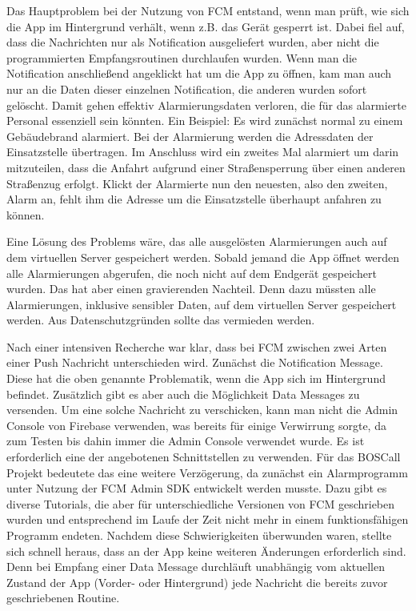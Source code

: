 Das Hauptproblem bei der Nutzung von FCM entstand, wenn man prüft, wie sich die App im Hintergrund verhält, wenn z.B. das Gerät gesperrt ist. Dabei fiel auf, dass die Nachrichten nur als Notification ausgeliefert wurden, aber nicht die programmierten Empfangsroutinen durchlaufen wurden. Wenn man die Notification anschließend angeklickt hat um die App zu öffnen, kam man auch nur an die Daten dieser einzelnen Notification, die anderen wurden sofort gelöscht. Damit gehen effektiv Alarmierungsdaten verloren, die für das alarmierte Personal essenziell sein könnten. Ein Beispiel: Es wird zunächst normal zu einem Gebäudebrand alarmiert. Bei der Alarmierung werden die Adressdaten der Einsatzstelle übertragen. Im Anschluss wird ein zweites Mal alarmiert um darin mitzuteilen, dass die Anfahrt aufgrund einer Straßensperrung über einen anderen Straßenzug erfolgt. Klickt der Alarmierte nun den neuesten, also den zweiten, Alarm an, fehlt ihm die Adresse um die Einsatzstelle überhaupt anfahren zu können.

Eine Lösung des Problems wäre, das alle ausgelösten Alarmierungen auch auf dem virtuellen Server gespeichert werden. Sobald jemand die App öffnet werden alle Alarmierungen abgerufen, die noch nicht auf dem Endgerät gespeichert wurden. Das hat aber einen gravierenden Nachteil. Denn dazu müssten alle Alarmierungen, inklusive sensibler Daten, auf dem virtuellen Server gespeichert werden. Aus Datenschutzgründen sollte das vermieden werden.

Nach einer intensiven Recherche war klar, dass bei FCM zwischen zwei Arten einer Push Nachricht unterschieden wird. Zunächst die Notification Message. Diese hat die oben genannte Problematik, wenn die App sich im Hintergrund befindet. Zusätzlich gibt es aber auch die Möglichkeit Data Messages zu versenden. Um eine solche Nachricht zu verschicken, kann man nicht die Admin Console von Firebase verwenden, was bereits für einige Verwirrung sorgte, da zum Testen bis dahin immer die Admin Console verwendet wurde. Es ist erforderlich eine der angebotenen Schnittstellen zu verwenden. Für das BOSCall Projekt bedeutete das eine weitere Verzögerung, da zunächst ein Alarmprogramm unter Nutzung der FCM Admin SDK entwickelt werden musste. Dazu gibt es diverse Tutorials, die aber für unterschiedliche Versionen von FCM geschrieben wurden und entsprechend im Laufe der Zeit nicht mehr in einem funktionsfähigen Programm endeten. Nachdem diese Schwierigkeiten überwunden waren, stellte sich schnell heraus, dass an der App keine weiteren Änderungen erforderlich sind. Denn bei Empfang einer Data Message durchläuft unabhängig vom aktuellen Zustand der App (Vorder- oder Hintergrund) jede Nachricht die bereits zuvor geschriebenen Routine.
